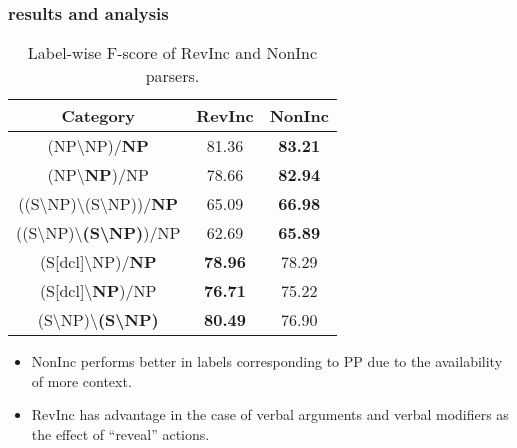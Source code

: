 \documentclass[10pt]{beamer}
\begin{document}
\begin{frame}
    \frametitle{results and analysis}
    \begingroup
    \small
    \begin{center}
    \begin{table}
        \caption{Label-wise F-score of RevInc and NonInc parsers.}
            \begin{tabular}{ccc}
            \toprule
            Category                                                               & RevInc         & NonInc         \\
            \midrule
            (NP{\textbackslash}NP)/\textbf{NP}                                     & 81.36          & \textbf{83.21} \\
            (NP\textbackslash\textbf{NP})/NP                                       & 78.66          & \textbf{82.94} \\
            ((S{\textbackslash}NP)\textbackslash(S{\textbackslash}NP))/\textbf{NP} & 65.09          & \textbf{66.98} \\
            ((S{\textbackslash}NP)\textbackslash\textbf{(S{\textbackslash}NP)})/NP & 62.69          & \textbf{65.89} \\
            (S[dcl]{\textbackslash}NP)/\textbf{NP}                                 & \textbf{78.96} & 78.29          \\
            (S[dcl]\textbackslash\textbf{NP})/NP                                   & \textbf{76.71} & 75.22          \\
            (S{\textbackslash}NP)\textbackslash\textbf{(S{\textbackslash}NP)}      & \textbf{80.49} & 76.90          \\
            \bottomrule
            \end{tabular}
    \end{table}
    \end{center}
    \endgroup

    \smallskip

    \begin{itemize}
        \item NonInc performs better in labels corresponding to PP due to the availability of more context.
        \item RevInc has advantage in the case of verbal arguments and verbal modifiers as the effect of ``reveal'' actions.
    \end{itemize}
\end{frame}
\end{document}
